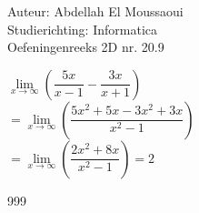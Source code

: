 \documentclass[a4paper]{article}
\begin{document}
  
\noindent \large Auteur: Abdellah El Moussaoui \\
\noindent \large Studierichting: Informatica\\
\noindent \large Oefeningenreeks 2D nr. 20.9\\

\medskip

\normalsize

$\lim\limits_{x \rightarrow \infty} \left (\dfrac{5x}{x-1} - \dfrac{3x}{x+1} \right )$\\

$ = \lim\limits_{x \rightarrow \infty} \left (\dfrac{5x^2 + 5x - 3x^2 + 3x}{x^2-1}\right )$\\

$ = \lim\limits_{x \rightarrow \infty} \left (\dfrac{2x^2 + 8x}{x^2-1}\right ) = 2$\\


\begin{thebibliography}{999}
\end{thebibliography}
\end{document}
